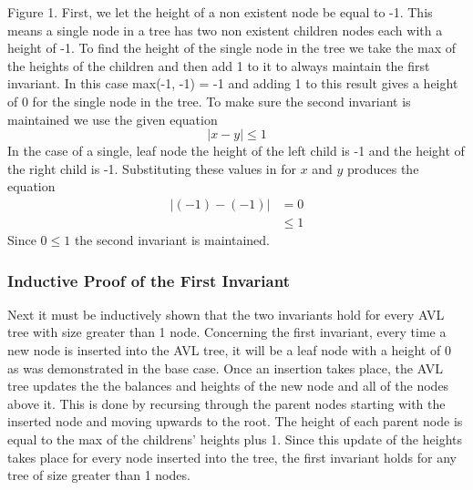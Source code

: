\documentclass[12pt]{article}
\begin{document}
Figure 1.  First, we let the height of a non existent node be equal to -1.
This means a single node in a tree has two non existent children nodes each
with a height of -1.  To find the height of the single node in the tree we take the max of the
heights of the children and then add 1 to it to always maintain the first
invariant.  In this case max(-1, -1) = -1 and adding 1 to this result gives a
height of 0 for the single node in the tree.  To make sure the second invariant
is maintained we use the given equation
$$
|x-y| \le 1
$$
In the case of a single, leaf node the height of the left child is
-1 and the height of the right child is -1.  Substituting these values in for
$x$ and $y$ produces the equation
\begin{align*}
|(-1)-(-1)| &= 0\\
&\le 1
\end{align*}
Since $0 \le 1$ the second invariant is maintained.
\subsubsection*{Inductive Proof of the First Invariant}
Next it must be inductively shown that the two invariants hold for every AVL
tree with size greater than 1 node.  Concerning the first invariant, every time
a new node is inserted into the AVL tree, it will be a leaf node with a height
of 0 as was demonstrated in the base case.  Once an insertion takes place, the
AVL tree updates the the balances and heights of the new node and all of the
nodes above it.  This is done by recursing through 
the parent nodes starting with the inserted node and moving upwards to the
root.  The height of each parent node is equal to the max of
the childrens' heights plus 1.  Since this update of the heights takes place for
every node inserted into the tree, the first invariant holds for any tree of
size greater than 1 nodes.\\
\end{document}
